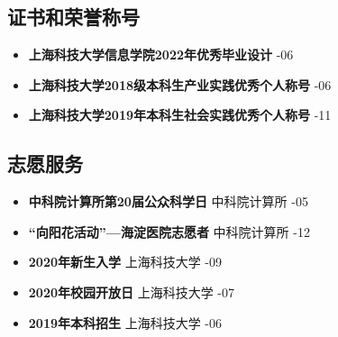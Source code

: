 \documentclass[a4paper,10pt]{ctexart} %
\begin{document}

\begin{keepsection}

\section{证书和荣誉称号}
\begin{itemize}
    \item \textbf{上海科技大学信息学院2022年优秀毕业设计} \hfill {}-06
    \item \textbf{上海科技大学2018级本科生产业实践优秀个人称号} \hfill {}-06
    \item \textbf{上海科技大学2019年本科生社会实践优秀个人称号} \hfill {}-11
\end{itemize}

\end{keepsection}



\begin{keepsection}

\section{志愿服务}
\begin{itemize}
    \item \textbf{中科院计算所第20届公众科学日}  \hfill 中科院计算所 -05
    \item \textbf{“向阳花活动”—海淀医院志愿者}  \hfill 中科院计算所 -12
    \item \textbf{2020年新生入学}  \hfill 上海科技大学 -09
    \item \textbf{2020年校园开放日}  \hfill 上海科技大学 -07
    \item \textbf{2019年本科招生}  \hfill 上海科技大学 -06
\end{itemize}

\end{keepsection}
\end{document}
